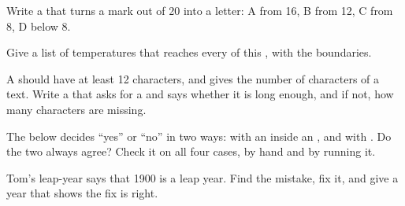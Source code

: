\begin{exercise}[$\star\star$]\label{exo:g6:if-else:8}
Write a  that turns a mark out of 20 into a letter: A from 16, B from 12,
C from 8, D below 8.
\end{exercise}

\begin{exercise}[$\star\star$]\label{exo:g6:if-else:9}
Give a list of temperatures that reaches every  of this , with
the boundaries.

\label{lst:g6:if-else:reach}
\end{exercise}

\begin{exercise}[$\star\star\star$]\label{exo:g6:if-else:10}
A  should have at least 12 characters, and  gives
the number of characters of a text. Write a  that asks for a 
and says whether it is long enough, and if not, how many characters are
missing.
\end{exercise}

\begin{exercise}[$\star\star\star$]\label{exo:g6:if-else:11}
The  below decides ``yes'' or ``no'' in two ways: with an 
inside an , and with . Do the two always agree? Check it on
all four cases, by hand and by running it.

\label{lst:g6:if-else:nested-vs-and}
\end{exercise}

\begin{exercise}[$\star\star\star$]\label{exo:g6:if-else:12}
Tom's leap-year  says that 1900 is a leap year. Find the mistake, fix
it, and give a year that shows the fix is right.

\label{lst:g6:if-else:leap-bug}
\end{exercise}

